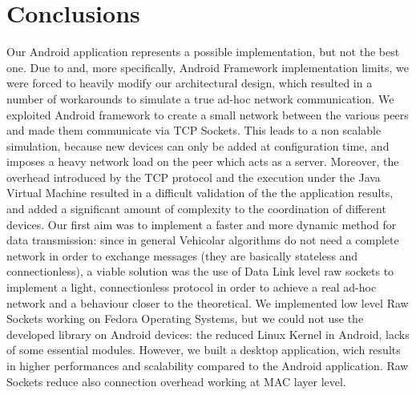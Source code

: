 \section{Conclusions}
	Our Android application represents a possible implementation, but not the best one. Due to \direct and, more specifically, Android \direct Framework implementation limits, we were forced to heavily modify our architectural design, which resulted in a number of workarounds to simulate a true ad-hoc network communication. We exploited Android \direct framework to create a small network between the various peers and made them communicate via TCP Sockets. This leads to a non scalable simulation, because new devices can only be added at configuration time, and imposes a heavy network load on the peer which acts as a server.
	Moreover, the overhead introduced by the TCP protocol and the execution under the Java Virtual Machine resulted in a difficult validation of the the application results, and added a significant amount of complexity to the coordination of different devices.
	Our first aim was to implement a faster and more dynamic method for data transmission: since in general Vehicolar algorithms do not need a complete network in order to exchange messages (they are basically stateless and connectionless), a viable solution was the use of Data Link level raw sockets to implement a light, connectionless protocol in order to achieve a real ad-hoc network and a behaviour closer to the theoretical. We implemented low level Raw Sockets working on Fedora Operating Systems, but we could not use the developed library on Android devices: the reduced Linux Kernel in Android, lacks of some essential modules. However, we built a desktop application, wich results in higher performances and scalability compared to the Android application. Raw Sockets reduce also connection overhead working at MAC layer level.

